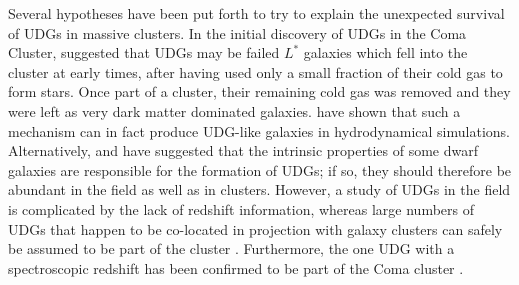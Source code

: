 \documentclass[usenatbib,fleqn]{mnras}
\begin{document}
Several hypotheses have been put forth to try to explain the unexpected survival of UDGs in massive clusters. In the initial discovery of UDGs in the Coma Cluster, \cite{vandokkum15_coma} suggested that UDGs may be failed $L^*$ galaxies which fell into the cluster at early times, after having used only a small fraction of their cold gas to form stars. Once part of a cluster, their remaining cold gas was removed and they were left as very dark matter dominated galaxies.
\cite{yozin15} have shown that such a mechanism can in fact produce UDG-like galaxies in hydrodynamical simulations. Alternatively, \cite{amorisco16} and \cite{dicintio17} have suggested that the intrinsic properties of some dwarf galaxies are responsible for the formation of UDGs; if so, they should therefore be abundant in the field as well as in clusters. However, a study of UDGs in the field is complicated by the lack of redshift information, whereas large numbers of UDGs that happen to be co-located in projection with galaxy clusters can safely be assumed to be part of the cluster \citep[or at least a significant fraction of them; e.g.,][]{vdburg16}. Furthermore, the one UDG with a spectroscopic redshift has been confirmed to be part of the Coma cluster \citep{vandokkum15_spec}.
\end{document}
